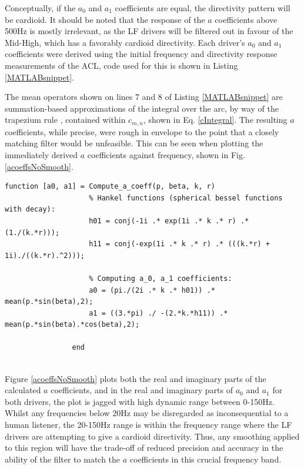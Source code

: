 \documentclass{report}
\begin{document}
            Conceptually, if the $a_0$ and $a_1$ coefficients are equal, the directivity pattern will be cardioid.
            It should be noted that the response of the $a$ coefficients above 500Hz is mostly irrelevant, as the LF drivers will be filtered out in favour of the Mid-High, which has a favorably cardioid directivity.
            Each driver's $a_0$ and $a_1$ coefficients were derived using the initial frequency and directivity response measurements of the ACL, code used for this is shown in Listing \ref{MATLABsnippet}.

            The mean operators shown on lines 7 and 8 of Listing \ref{MATLABsnippet} are summation-based approximations of the integral over the arc, by way of the trapezium rule \cite{hargreaves}, contained within $c_{m,n}$, shown in Eq. \ref{cIntegral}.
            The resulting $a$ coefficients, while precise, were rough in envelope to the point that a closely matching filter would be unfeasible.
            This can be seen when plotting the immediately derived $a$ coefficients against frequency, shown in Fig.\ref{acoeffsNoSmooth}.
            
            \newpage 

            \begin{lstlisting}[style=Matlab-editor, gobble=16, caption = {MATLAB function used to calculate $a$ coefficients using measured pressure $p$.}, label = {MATLABsnippet}]
                function [a0, a1] = Compute_a_coeff(p, beta, k, r)
                    % Hankel functions (spherical bessel functions with decay):
                    h01 = conj(-1i .* exp(1i .* k .* r) .* (1./(k.*r)));
                    h11 = conj(-exp(1i .* k .* r) .* (((k.*r) + 1i)./((k.*r).^2)));

                    % Computing a_0, a_1 coefficients:
                    a0 = (pi./(2i .* k .* h01)) .* mean(p.*sin(beta),2);
                    a1 = ((3.*pi) ./ -(2.*k.*h11)) .* mean(p.*sin(beta).*cos(beta),2);
                
                end
                
            \end{lstlisting}
            

            Figure \ref{acoeffsNoSmooth} plots both the real and imaginary parts of the calculated $a$ coefficients, and in the real and imaginary parts of $a_0$ and $a_1$ for both drivers, the plot is jagged with high dynamic range between 0-150Hz.
            Whilst any frequencies below 20Hz may be disregarded as inconsequential to a human listener, the 20-150Hz range is within the frequency range where the LF drivers are attempting to give a cardioid directivity.
            Thus, any smoothing applied to this region will have the trade-off of reduced precision and accuracy in the ability of the filter to match the $a$ coefficients in this crucial frequency band.
            
\end{document}
